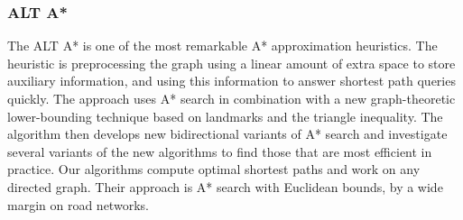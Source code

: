 \documentclass[12pt]{article}
\begin{document}
\subsubsection{ALT A* \cite{By Andrew Goldberg and Chris Harrelson}}
The ALT A* is one of the most remarkable A* approximation heuristics. The heuristic is preprocessing the graph using a linear amount of extra space to store auxiliary information, and using this information to answer shortest path queries quickly. The approach uses A* search in combination with a new graph-theoretic lower-bounding technique based on landmarks and the triangle inequality. The algorithm then develops new bidirectional variants of A* search and investigate several variants of the new algorithms to find those that are most efficient in practice. Our algorithms compute optimal shortest paths and work on any directed graph. Their approach is A* search with Euclidean bounds, by a wide margin on road networks.



\poi
\printbibliography

\end{document}
